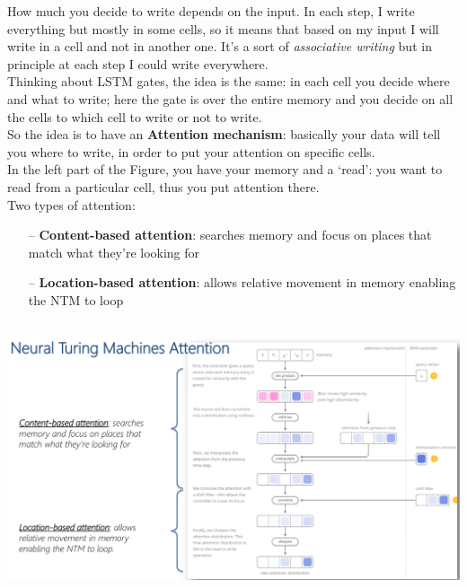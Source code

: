 How much you decide to write depends on the input. In each step, I write everything but mostly in some cells, so it means that based on my input I will write in a cell and not in another one. It’s a sort of \textit{associative writing} but in principle at each step I could write everywhere. \\
Thinking about LSTM gates, the idea is the same: in each cell you decide where and what to write; here the gate is over the entire memory and you decide on all the cells to which cell to write or not to write.\\
So the idea is to have an \textbf{Attention mechanism}: basically your data will tell you where to write, in order to put your attention on specific cells. \\
In the left part of the Figure, you have your memory and a ‘read’: you want to read from a particular cell, thus you put attention there. \\
Two types of attention: 
\begin{itemize}
    \item[--] \textbf{Content-based attention}: searches memory and focus on places that match what they're looking for
    
    \item[--] \textbf{Location-based attention}: allows relative movement in memory enabling the NTM to loop
\end{itemize}{}

\begin{minipage}{\linewidth}
        \centering
        \hspace*{-2cm}    
        \includegraphics[width=14cm, height=8cm]{images/attention_example.png}
\end{minipage} \\ \\

